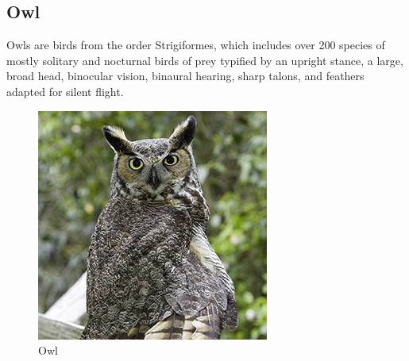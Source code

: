 \subsection{Owl}
Owls are birds from the order Strigiformes, which includes over 200 species of mostly solitary and nocturnal birds of prey typified by an upright stance, a large, broad head, binocular vision, binaural hearing, sharp talons, and feathers adapted for silent flight.
\begin{figure}[htp]
    \centering
    \includegraphics{images (1).jpeg}
    \caption{Owl}
\end{figure}